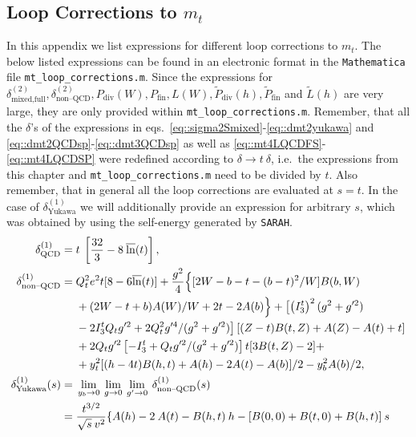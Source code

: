 \documentclass[a4paper,12pt]{book}
\begin{document}
\begin{appendices}
\chapter{Loop Corrections to $m_t$}
\label{ap::expressions}
In this appendix we list expressions for different loop corrections to $m_t$. The below listed expressions can be found in an electronic format in the \texttt{Mathematica} file \texttt{mt\_loop\_corrections.m}. Since the expressions for $\delta^{(2)}_\text{mixed,full}, \delta^{(2)}_\text{non--QCD}, P_\text{div}(W),P_\text{fin}, L(W), \widetilde{P}_\text{div}(h),\widetilde{P}_\text{fin}$ and $\widetilde{L}(h)$ are very large, they are only provided within \texttt{mt\_loop\_corrections.m}.  Remember, that all the $\delta$'s of the expressions in eqs.\ \eqref{eq::sigma2Smixed}-\eqref{eq::dmt2yukawa} and \eqref{eq::dmt2QCDsp}-\eqref{eq::dmt3QCDsp} as well as \eqref{eq::mt4LQCDFS}-\eqref{eq::mt4LQCDSP} were redefined according to $\delta \rightarrow t \> \delta$, i.e.\ the expressions from this chapter and \texttt{mt\_loop\_corrections.m} need to be divided by $t$. Also remember, that in general all the loop corrections are evaluated at $s=t$. In the case of $\delta^{(1)}_\text{Yukawa}$ we will additionally provide an expression for arbitrary $s$, which was obtained by using the self-energy generated by \texttt{SARAH}.
\begin{align}
\delta^{(1)}_\text{QCD}={}& t\> \left[\frac{32}{3}-8\> \overline{\ln}(t)\right],\\
\delta^{(1)}_\text{non--QCD}={}&Q_t^2 e^2 t [8 - 6 \overline{\ln}(t)] + 
\frac{g^2}{4} \Bigl \{
[2 W - b - t - (b-t)^2/W] B(b,W) 
\nonumber \\
&+  (2W -t + b) A(W)/W + 2 t - 2A(b) \Bigr \}
+ \bigl [\left (I_3^t \right )^2 (g^2 + g^{\prime 2})
\nonumber \\ 
&- 2 I_3^t Q_t g^{\prime 2} 
+ 2 Q_t^2 g^{\prime 4}/(g^2 + g^{\prime 2}) \bigr ]
\left [ (Z-t) B(t,Z) + A(Z) - A(t) + t \right ]
\nonumber \\ 
&+ 2 Q_t g^{\prime 2} \left [-I_3^t +  Q_t g^{\prime 2}/(g^2 + g^{\prime 2}) 
\right ]
t [3 B(t,Z) - 2]
+ 
\nonumber \\  
&+
y_t^2 [(h-4t) B(h,t) + A(h) - 2 A(t) - A(b)]/2
- y_b^2 A(b)/2,\\
\nonumber
\delta^{(1)}_\text{Yukawa}(s) ={}& \lim_{y_b\rightarrow 0}\> \lim_{g\rightarrow 0}\>\lim_{g^\prime\rightarrow 0}\> \delta^{(1)}_\text{non--QCD}(s)\\
\nonumber
={}& \frac{t^{3/2}}{\sqrt{s} \>v^2}\{ A(h)-2\> A(t)- B(h,t)\>h-[B(0,0)+B(t,0)+B(h,t)]\> s\\

\end{align}
\end{appendices}
\end{document}
